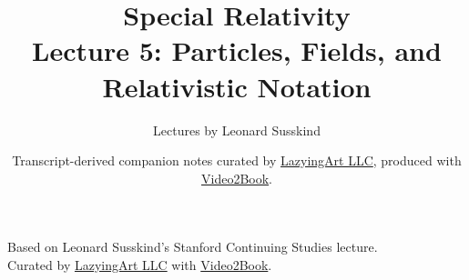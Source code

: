 \documentclass[11pt,oneside]{book}
\begin{document}
\frontmatter
\title{Special Relativity\\Lecture 5: Particles, Fields, and Relativistic Notation}
\author{Lectures by Leonard Susskind}
\date{Transcript-derived companion notes curated by \href{https://lazying.art}{LazyingArt LLC}, produced with \href{https://github.com/lachlanchen/Video2Book}{Video2Book}.}
\maketitle
\setcounter{page}{2}
\begin{center}
\small Based on Leonard Susskind's Stanford Continuing Studies lecture.\\
Curated by \href{https://lazying.art}{LazyingArt LLC} with \href{https://github.com/lachlanchen/Video2Book}{Video2Book}.
\end{center}
\clearpage
\mainmatter

\end{document}
